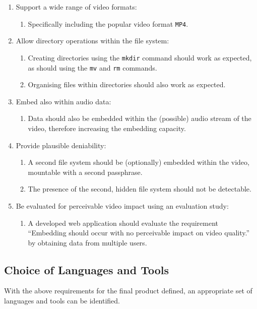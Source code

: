 \documentclass[paper=a4, fontsize=11pt,twoside]{scrartcl}
\numberwithin{table}{section}
\numberwithin{figure}{section}
\numberwithin{algorithm}{section}
\begin{document}
\begin{enumerate}
\item Support a wide range of video formats:
	\begin{enumerate}
		\item Specifically including the popular video format \texttt{MP4}.		
	\end{enumerate}
\item Allow directory operations within the file system:
	\begin{enumerate}
		\item Creating directories using the \texttt{mkdir} command should work as expected, as should using the \texttt{mv} and \texttt{rm} commands.
		\item Organising files within directories should also work as expected.
	\end{enumerate}	
\item Embed also within audio data:
	\begin{enumerate}
		\item Data should also be embedded within the (possible) audio stream of the video, therefore increasing the embedding capacity.
	\end{enumerate}	
\item Provide plausible deniability:
	\begin{enumerate}
		\item A second file system should be (optionally) embedded within the video, mountable with a second passphrase.
		\item The presence of the second, hidden file system should not be detectable.
	\end{enumerate}
\item Be evaluated for perceivable video impact using an evaluation study:
	\begin{enumerate}
		\item A developed web application should evaluate the requirement ``Embedding should occur with no perceivable impact on video quality.'' by obtaining data from multiple users.
	\end{enumerate}		
\end{enumerate}

\subsection{Choice of Languages and Tools}

With the above requirements for the final product defined, an appropriate set of languages and tools can be identified.
\end{document}

